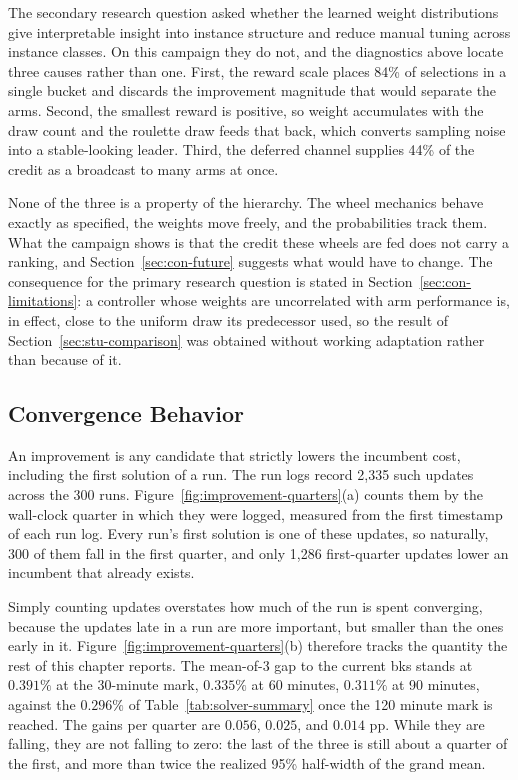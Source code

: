 The secondary research question asked whether the learned weight distributions
give interpretable insight into instance structure and reduce manual tuning
across instance classes.  On this campaign they do not, and the diagnostics
above locate three causes rather than one.  First, the reward scale places 84\% of
selections in a single bucket and discards the improvement magnitude that would
separate the arms.  Second, the smallest reward is positive, so weight accumulates with the draw count and the roulette draw feeds that back, which converts sampling
noise into a stable-looking leader.  Third, the deferred channel supplies 44\% of the
credit as a broadcast to many arms at once.

None of the three is a property of the hierarchy.  The wheel mechanics behave
exactly as specified, the weights move freely, and the probabilities track them.
What the campaign shows is that the credit these wheels are fed does not carry a
ranking, and Section~\ref{sec:con-future} suggests what would have to
change.  The consequence for the primary research question is stated in
Section~\ref{sec:con-limitations}: a controller whose weights are uncorrelated with
arm performance is, in effect, close to the uniform draw its predecessor used,
so the result of Section~\ref{sec:stu-comparison} was obtained without
working adaptation rather than because of it.

\subsection{Convergence Behavior}
\label{sec:stu-convergence}

An improvement is any candidate that strictly lowers the incumbent cost,
including the first solution of a run. The run logs record 2,335 such updates
across the 300 runs. Figure~\ref{fig:improvement-quarters}(a) counts them by the
wall-clock quarter in which they were logged, measured from the first timestamp
of each run log. Every run's first solution is one of these updates, so naturally, 300 of them fall in the first quarter, and only 1,286 first-quarter updates lower an incumbent that already exists.

Simply counting updates overstates how much of the run is spent converging, because
the updates late in a run are more important, but smaller than the ones early in it.
Figure~\ref{fig:improvement-quarters}(b) therefore tracks the quantity the rest of this chapter reports. The mean-of-3 gap to the current \gls{bks} stands at $0.391\%$ at the 30-minute mark, $0.335\%$ at 60 minutes, $0.311\%$ at 90 minutes, against the $0.296\%$ of Table~\ref{tab:solver-summary} once the 120 minute mark is reached. The
gains per quarter are $0.056$, $0.025$, and $0.014$ pp. While they are falling, they are not falling to zero: the last of the three is still about a quarter of
the first, and more than twice the realized 95\% half-width of the grand mean.

